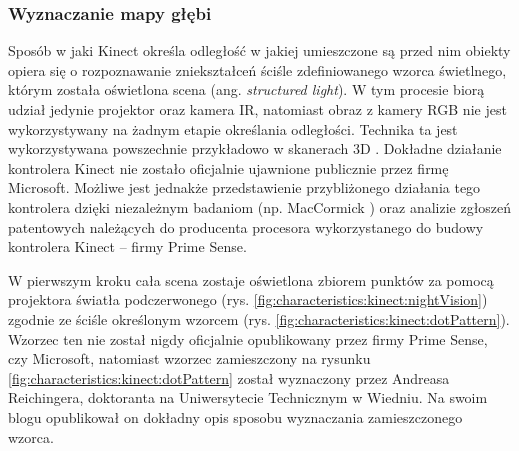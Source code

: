\subsubsection*{Wyznaczanie mapy głębi}
Sposób w jaki Kinect określa odległość w jakiej umieszczone są przed nim obiekty opiera się o rozpoznawanie zniekształceń ściśle zdefiniowanego wzorca świetlnego, którym została oświetlona scena (ang. \emph{structured light}). W tym procesie biorą udział jedynie projektor oraz kamera IR, natomiast obraz z kamery RGB nie jest wykorzystywany na żadnym etapie określania odległości. Technika ta jest wykorzystywana powszechnie przykładowo w skanerach 3D \cite{david2016,lmi2016}. Dokładne działanie kontrolera Kinect nie zostało oficjalnie ujawnione publicznie przez firmę Microsoft. Możliwe jest jednakże przedstawienie przybliżonego działania tego kontrolera dzięki niezależnym badaniom (np. MacCormick \cite{MacCormick2011}) oraz analizie zgłoszeń patentowych \cite{patent:20080106746,patent:20100020078,patent:20100118123} należących do producenta procesora wykorzystanego do budowy kontrolera Kinect -- firmy Prime Sense.
		
W pierwszym kroku cała scena zostaje oświetlona zbiorem punktów za pomocą projektora światła podczerwonego (rys. \ref{fig:characteristics:kinect:nightVision}) zgodnie ze ściśle określonym wzorcem (rys. \ref{fig:characteristics:kinect:dotPattern}). Wzorzec ten nie został nigdy oficjalnie opublikowany przez firmy Prime Sense, czy Microsoft, natomiast wzorzec zamieszczony na rysunku \ref{fig:characteristics:kinect:dotPattern} został wyznaczony przez Andreasa Reichingera, doktoranta na Uniwersytecie Technicznym w Wiedniu. Na swoim blogu opublikował on dokładny opis sposobu wyznaczania zamieszczonego wzorca\cite{reichinger2011}.
		
